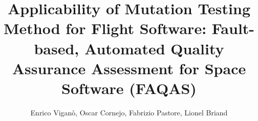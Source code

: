 \documentclass[acmsmall,nonacm]{acmart}
\begin{document}
\title{Applicability of Mutation Testing Method for Flight Software: Fault-based, Automated Quality Assurance Assessment for Space Software (FAQAS)}

\author{Enrico Viganò, Oscar Cornejo, Fabrizio Pastore, Lionel Briand}

%
%
%

\end{document}

